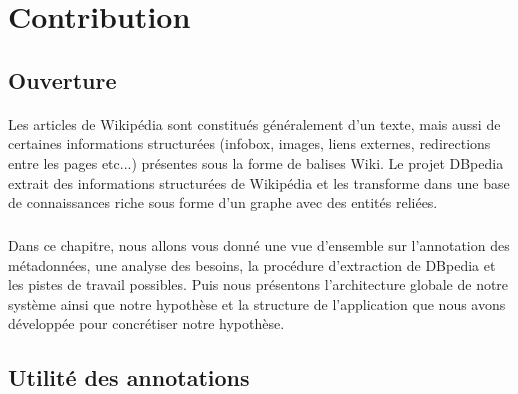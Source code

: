 \documentclass[12pt,a4	]{report}
\begin{document}
\section*{Contribution}
\subsection*{Ouverture}
\paragraph{}
Les articles de Wikipédia sont constitués généralement d'un texte, mais aussi de certaines informations structurées (infobox, images, liens externes, redirections entre les pages etc...) présentes sous la forme de balises Wiki. 
Le projet DBpedia extrait des informations structurées de Wikipédia et les transforme dans une base de connaissances riche sous forme d'un graphe avec des entités reliées.
\subparagraph{}
Dans ce chapitre, nous allons vous donné une vue d'ensemble sur l'annotation des métadonnées, une analyse des besoins, la procédure d'extraction de DBpedia et les pistes de travail possibles. Puis nous présentons l'architecture globale de notre système ainsi que notre hypothèse et la structure de l'application que nous avons développée pour concrétiser notre hypothèse. 
\subsection*{Utilité des annotations}
\end{document}
